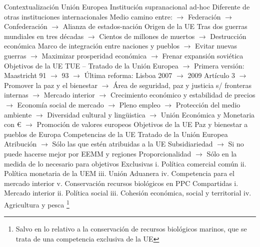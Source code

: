 \documentclass{nuevotema}
\begin{document}
\esquemalargo


















\begin{esquemal}
	\1[] 
		\2 Contextualización
			\3 Unión Europea
				\4 Institución supranacional ad-hoc
				\4[] Diferente de otras instituciones internacionales
				\4[] Medio camino entre:
				\4[] $\to$ Federación
				\4[] $\to$ Confederación
				\4[] $\to$ Alianza de estados-nación
				\4 Origen de la UE
				\4[] Tras dos guerras mundiales en tres décadas
				\4[] $\to$ Cientos de millones de muertos
				\4[] $\to$ Destrucción económica
				\4[] Marco de integración entre naciones y pueblos
				\4[] $\to$ Evitar nuevas guerras
				\4[] $\to$ Maximizar prosperidad económica
				\4[] $\to$ Frenar expansión soviética
				\4 Objetivos de la UE
				\4[] TUE -- Tratado de la Unión Europea
				\4[] $\to$ Primera versión: Maastricht 91 $\to$ 93
				\4[] $\to$ Última reforma: Lisboa 2007 $\to$ 2009
				\4[] Artículo 3
				\4[] $\to$ Promover la paz y el bienestar
				\4[] $\to$ Área de seguridad, paz y justicia s/ fronteras internas
				\4[] $\to$ Mercado interior
				\4[] $\to$ Crecimiento económico y estabilidad de precios
				\4[] $\to$ Economía social de mercado
				\4[] $\to$ Pleno empleo
				\4[] $\to$ Protección del medio ambiente
				\4[] $\to$ Diversidad cultural y lingüistica
				\4[] $\to$ Unión Económica y Monetaria con €
				\4[] $\to$ Promoción de valores europeos
				\4[$\to$] Objetivos de la UE
				\4[] Paz y bienestar a pueblos de Europa
			\3 Competencias de la UE
				\4 Tratado de la Unión Europea
				\4[] Atribución
				\4[] $\to$ Sólo las que estén atribuidas a la UE
				\4[] Subsidiariedad
				\4[] $\to$ Si no puede hacerse mejor por EEMM y regiones
				\4[] Proporcionalidad
				\4[] $\to$ Sólo en la medida de lo necesario para objetivos
				\4 Exclusivas
				\4[] i. Política comercial común
				\4[] ii. Política monetaria de la UEM
				\4[] iii. Unión Aduanera
				\4[] iv. Competencia para el mercado interior
				\4[] v. Conservación recursos biológicos en PPC
				\4 Compartidas
				\4[] i. Mercado interior
				\4[] ii. Política social
				\4[] iii. Cohesión económica, social y territorial
				\4[] iv. Agricultura y pesca \footnote{Salvo en lo relativo a la conservación de recursos biológicos marinos, que se trata de una competencia exclusiva de la UE}

\end{esquemal}
\end{document}
